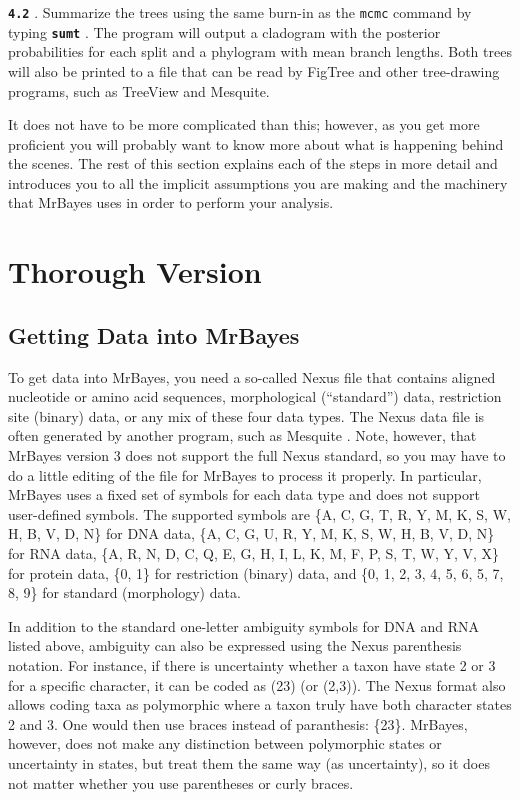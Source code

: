 \documentclass[12pt]{book}
\newcommand{\ttt}[1]{\texttt{#1} }
\newcommand{\tb}[1]{\ttt{\textbf{#1}} }
\begin{document}
\tb{4.2}. Summarize the trees using the same burn-in as the \ttt{mcmc} command by typing
\tb{sumt} . The program will output a cladogram with the posterior probabilities for each split
and a phylogram with mean branch lengths. Both trees will also be printed to a file that can be
read by FigTree and other tree-drawing programs, such as TreeView and Mesquite.

It does not have to be more complicated than this; however, as you get more proficient you will
probably want to know more about what is happening behind the scenes. The rest of this section
explains each of the steps in more detail and introduces you to all the implicit assumptions you
are making and the machinery that MrBayes uses in order to perform your analysis.

\section{Thorough Version}

\subsection{Getting Data into MrBayes}
To get data into MrBayes, you need a so-called Nexus file that contains aligned nucleotide or amino
acid sequences, morphological (``standard'') data, restriction site (binary) data, or any mix of
these four data types. The Nexus data file is often generated by another program, such as Mesquite
\citep{Maddison06}.  Note, however, that MrBayes version 3 does not support the full Nexus
standard, so you may have to do a little editing of the file for MrBayes to process it properly. In
particular, MrBayes uses a fixed set of symbols for each data type and does not support
user-defined symbols. The supported symbols are \{A, C, G, T, R, Y, M, K, S, W, H, B, V, D, N\} for
DNA data, \{A, C, G, U, R, Y, M, K, S, W, H, B, V, D, N\} for RNA data, \{A, R, N, D, C, Q, E, G,
H, I, L, K, M, F, P, S, T, W, Y, V, X\} for protein data, \{0, 1\} for restriction (binary) data,
and \{0, 1, 2, 3, 4, 5, 6, 5, 7, 8, 9\} for standard (morphology) data. 

In addition to the standard one-letter ambiguity symbols for DNA and RNA listed above, ambiguity
can also be expressed using the Nexus parenthesis notation. For instance, if there is uncertainty
whether a taxon have state 2 or 3 for a specific character, it can be coded as (23) (or (2,3)).
The Nexus format also allows coding taxa as polymorphic \textemdash where a taxon truly have both
character states 2 and 3.  One would then use braces instead of paranthesis: \{23\}. MrBayes,
however, does not make any distinction between polymorphic states or uncertainty in states, but
treat them the same way (as uncertainty), so it does not matter whether you use parentheses or
curly braces.
 
\end{document}
